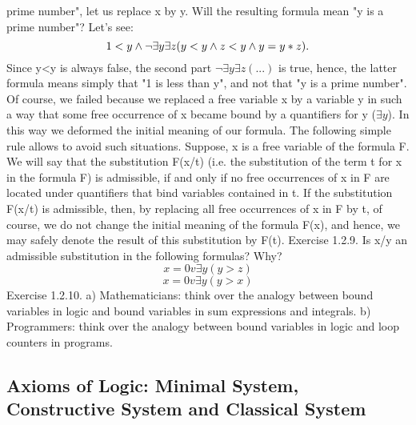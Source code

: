 prime number", let us replace x by y. Will the resulting formula mean "y is a prime number"? Let's see:
\[1<y \wedge  \neg \exists y\exists z(y<y \wedge  z<y \wedge  y=y*z).\]
Since y<y is always false, the second part \(\neg \exists y\exists z(...)\) is true, hence, the latter formula means simply that
"1 is less than y", and not that "y is a prime number".
Of course, we failed because we replaced a free variable x by a variable y in such a way that some free
occurrence of x became bound by a quantifiers for y (\(\exists y\)). In this way we deformed the initial meaning
of our formula.
The following simple rule allows to avoid such situations. Suppose, x is a free variable of the formula F.
We will say that the substitution F(x/t) (i.e. the substitution of the term t for x in the formula F) is
admissible, if and only if no free occurrences of x in F are located under quantifiers that bind variables
contained in t. If the substitution F(x/t) is admissible, then, by replacing all free occurrences of x in F by t,
of course, we do not change the initial meaning of the formula F(x), and hence, we may safely denote the
result of this substitution by F(t).
Exercise 1.2.9. Is x/y an admissible substitution in the following formulas? Why?
\[x=0 v \exists y(y>z)\]
\[x=0 v \exists y(y>x)\]
Exercise 1.2.10. a) Mathematicians: think over the analogy between bound variables in logic and bound
variables in sum expressions and integrals.
b) Programmers: think over the analogy between bound variables in logic and loop counters in programs.

\subsection{Axioms of Logic: Minimal System, Constructive System and Classical System}

